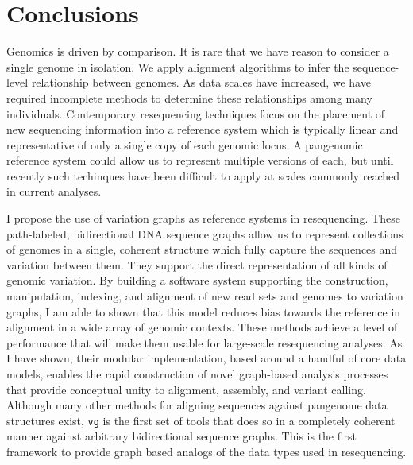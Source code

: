 %
\chapter{Conclusions}

\ifpdf
    \graphicspath{{Chapter3/Figs/Raster/}{Chapter3/Figs/PDF/}{Chapter3/Figs/}}
\else
    \graphicspath{{Chapter3/Figs/Vector/}{Chapter3/Figs/}}
\fi

Genomics is driven by comparison.
It is rare that we have reason to consider a single genome in isolation.
We apply alignment algorithms to infer the sequence-level relationship between genomes.
As data scales have increased, we have required incomplete methods to determine these relationships among many individuals.
Contemporary resequencing techniques focus on the placement of new sequencing information into a reference system which is typically linear and representative of only a single copy of each genomic locus.
A pangenomic reference system could allow us to represent multiple versions of each, but until recently such techinques have been difficult to apply at scales commonly reached in current analyses.

I propose the use of variation graphs as reference systems in resequencing.
These path-labeled, bidirectional DNA sequence graphs allow us to represent collections of genomes in a single, coherent structure which fully capture the sequences and variation between them.
They support the direct representation of all kinds of genomic variation.
By building a software system supporting the construction, manipulation, indexing, and alignment of new read sets and genomes to variation graphs, I am able to shown that this model reduces bias towards the reference in alignment in a wide array of genomic contexts.
These methods achieve a level of performance that will make them usable for large-scale resequencing analyses.
As I have shown, their modular implementation, based around a handful of core data models, enables the rapid construction of novel graph-based analysis processes that provide conceptual unity to alignment, assembly, and variant calling.
Although many other methods for aligning sequences against pangenome data structures exist, {\tt vg} is the first set of tools that does so in a completely coherent manner against arbitrary bidirectional sequence graphs.
This is the first framework to provide graph based analogs of the data types used in resequencing.

